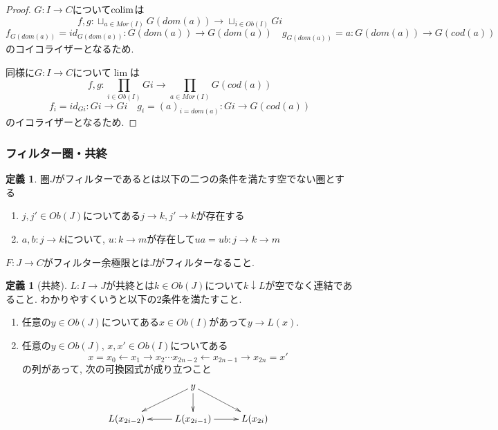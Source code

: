 \documentclass[dvipdfmx,a4paper,11pt]{article}
\newcommand{\colim}{{\rm colim}}
\theoremstyle{definition}
\newtheorem{dfn}[thm]{定義}
\begin{document}
\begin{proof}
$G : I \to C$について$\colim$は
$$
f,g : \sqcup_{a\in Mor(I)} G(dom(a)) \to \sqcup_{i \in Ob(I)} Gi 
$$
$$
f_{G(dom(a)) }=id_{G(dom(a))} : G(dom(a)) \to G(dom(a))
\quad g_{G(dom(a))}=a : G(dom(a)) \to G(cod(a))
$$
のコイコライザーとなるため. 

同様に$G : I \to C$について$\lim$は
$$
f,g : \prod_{i \in Ob(I)} Gi  \to \prod_{a\in Mor(I)} G(cod(a)) 
$$
$$
f_{i}=id_{Gi} : Gi\to Gi
\quad g_{i}=(a)_{i = dom(a)} : Gi\to G(cod(a))
$$
のイコライザーとなるため. 
\end{proof}



\subsubsection{フィルター圏・共終}


 \begin{tcolorbox}
 [colback = white, colframe = green!35!black, fonttitle = \bfseries,breakable = true]
\begin{dfn}
圏$J$がフィルターであるとは以下の二つの条件を満たす空でない圏とする
\begin{enumerate}
\item $j, j' \in Ob(J)$についてある$j \to k, j' \to k$が存在する
\item $a, b: j \to k$について, $u: k \to m$が存在して$ua = ub : j \to k \to m$
\end{enumerate}

$F : J \to C$がフィルター余極限とは$J$がフィルターなること.
\end{dfn}
\end{tcolorbox}




 \begin{tcolorbox}
 [colback = white, colframe = green!35!black, fonttitle = \bfseries,breakable = true]
\begin{dfn}[共終]
\label{dfn-cofiinal-category}
$L : I \to J$が共終とは$k \in Ob(J)$について$k \downarrow L$が空でなく連結であること.
わかりやすくいうと以下の2条件を満たすこと.
\begin{enumerate}
\item 任意の$y\in Ob(J)$についてある$x \in Ob(I)$があって$y \to L(x)$.
\item  任意の$y\in Ob(J)$, $x, x' \in Ob(I)$についてある
$$
x=x_0 \leftarrow x_1 \to x_2 \cdots x_{2n-2} \leftarrow x_{2n-1} \to x_{2n}=x'
$$
の列があって, 次の可換図式が成り立つこと
\begin{equation*}
\xymatrix@C=25pt@R=20pt{
& y\ar@{->}[ld]\ar@{->}[d]\ar@{->}[rd]
&
\\
L(x_{2i-2})
&L(x_{2i-1})\ar@{->}[l]\ar@{->}[r]
&L(x_{2i}) \\   
}
\end{equation*}
\end{enumerate}
\end{dfn}
\end{tcolorbox}
\end{document}
